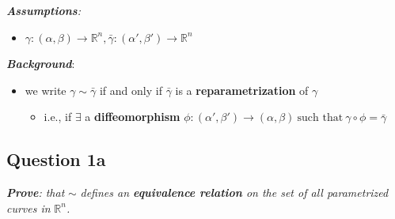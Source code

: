 \documentclass[
]{article}
\providecommand{\tightlist}{%
  \setlength{\itemsep}{0pt}\setlength{\parskip}{0pt}}
\begin{document}
\emph{\textbf{Assumptions}:}

\begin{itemize}
\tightlist
\item
  \(\gamma: (\alpha,\beta) \rightarrow \mathbb{R}^n, \bar{\gamma}: (\alpha',\beta') \rightarrow \mathbb{R}^n\)
\end{itemize}

\textbf{\emph{Background}}:

\begin{itemize}
\item
  we write \(\gamma \sim \bar{\gamma}\) if and only if \(\bar{\gamma}\)
  is a \textbf{reparametrization} of \(\gamma\)

  \begin{itemize}
  \tightlist
  \item
    i.e., if \(\exists\) a \textbf{diffeomorphism}
    \(\phi: (\alpha',\beta') \rightarrow (\alpha,\beta) ~ \text{such that} ~ \gamma \circ \phi = \bar{\gamma}\)
  \end{itemize}
\end{itemize}

\hypertarget{question-1a}{%
\subsection{Question 1a}\label{question-1a}}

\emph{\textbf{Prove}: that} \(\sim\) \emph{defines an
\textbf{equivalence relation} on the set of all parametrized curves in}
\(\mathbb{R}^n\)\emph{.}
\end{document}
